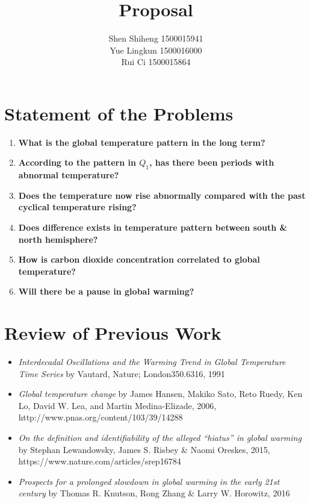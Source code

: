 \documentclass[10pt,a4paper]{article}
\author{Shen Shiheng 1500015941 \\ Yue Lingkun 1500016000\\ Rui Ci 1500015864}
\title{\textbf{Proposal}}
\begin{document}
\maketitle

\section{Statement of the Problems}
\begin{enumerate}
	\item \textbf{What is the global temperature pattern in the long term?}
	\item \textbf{According to the pattern in $Q_1$, has there been periods with abnormal temperature?}
	\item \textbf{Does the temperature now rise abnormally compared with the past cyclical temperature rising?}  
	\item \textbf{Does difference exists in temperature pattern between south \& north hemisphere?}
	\item \textbf{How is carbon dioxide concentration correlated to global temperature?} 
	\item \textbf{Will there be a pause in global warming?} 
\end{enumerate}

\section{Review of Previous Work}
\begin{itemize}
	\item \textit{Interdecadal Oscillations and the Warming Trend in Global Temperature Time Series} by Vautard, Nature; London350.6316, 1991 
	\item \textit{Global temperature change} by James Hansen, Makiko Sato, Reto Ruedy, Ken Lo, David W. Lea, and Martin Medina-Elizade, 2006, http://www.pnas.org/content/103/39/14288
	\item \textit{On the definition and identifiability of the alleged “hiatus” in global warming} by Stephan Lewandowsky, James S. Risbey \& Naomi Oreskes, 2015, https://www.nature.com/articles/srep16784 
	\item \textit{Prospects for a prolonged slowdown in global warming in the early 21st century} by Thomas R. Knutson, Rong Zhang \& Larry W. Horowitz, 2016
\end{itemize}
\end{document}
